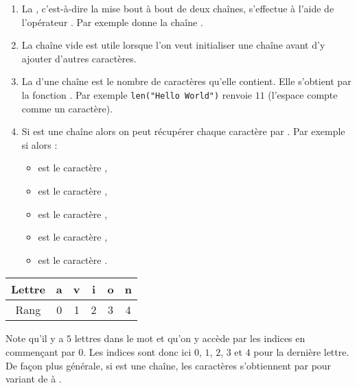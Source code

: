\documentclass[11pt,class=report,crop=false]{standalone}
\begin{document}
\begin{cours}
\sauteligne
\begin{enumerate}
  \item La , c'est-à-dire la mise bout à bout de deux chaînes, s'effectue à l'aide de l'opérateur \codeinline{+}. Par exemple  donne la chaîne .
 
  \item La chaîne vide  est utile lorsque l'on veut initialiser une chaîne avant d'y ajouter d'autres caractères.
  
  \item La  d'une chaîne est le nombre de caractères qu'elle contient. Elle s'obtient par la fonction .
  Par exemple \lstinline[showstringspaces=true]!len("Hello World")! renvoie $11$ (l'espace compte comme un caractère).
  
  \item Si  est une chaîne alors on peut récupérer chaque caractère par . Par exemple si 
   alors :
  \begin{itemize}
    \item {} est le caractère ,
    \item {} est le caractère , 
    \item {} est le caractère ,
    \item {} est le caractère ,       
    \item {} est le caractère .
  \end{itemize} 
\end{enumerate}  

\begin{center}
\begin{tabular}{|c||c|c|c|c|c|}
\hline
Lettre & a & v & i & o & n \\ \hline
Rang & 0 & 1 & 2 & 3 & 4 \\ \hline
\end{tabular}
\end{center}

  Note qu'il y a $5$ lettres dans le mot  et qu'on y accède par les indices en commençant par $0$. Les indices sont donc ici $0$, $1$, $2$, $3$ et $4$ pour la dernière lettre.  De façon plus générale, si  est une chaîne, les caractères s'obtiennent par  pour  variant de  à .
\end{cours}
\end{document}
